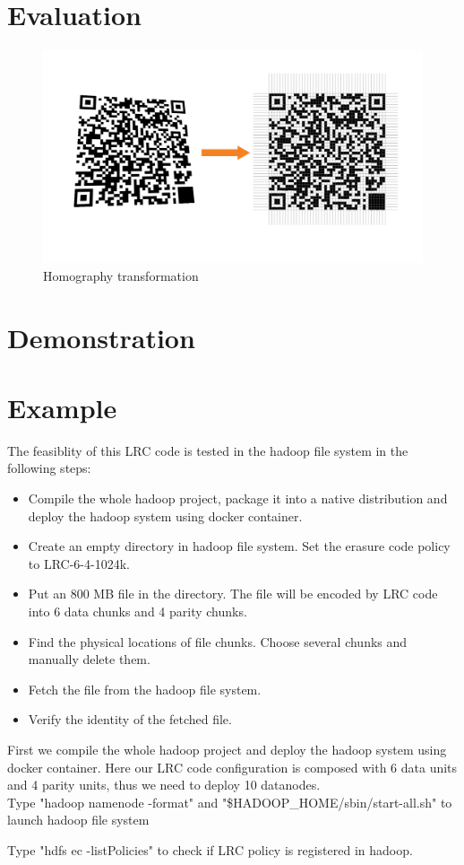 \documentclass[10pt]{article}
\begin{document}
\section{Evaluation}

\begin{figure}[H]
  \centering
  \includegraphics[width=\linewidth]{pic-01.png}
  \caption{Homography transformation}
\end{figure}


\section{Demonstration}

\section{Example}
The feasiblity of this LRC code is tested in the hadoop file system in the following steps:
\begin{itemize}
\item Compile the whole hadoop project, package it into a native distribution and deploy the hadoop system using docker container.
\item Create an empty directory in hadoop file system. Set the erasure code policy to LRC-6-4-1024k.
\item Put an 800 MB file in the directory. The file will be encoded by LRC code into 6 data chunks and 4 parity chunks.
\item Find the physical locations of file chunks. Choose several chunks and manually delete them. 
\item Fetch the file from the hadoop file system. 
\item Verify the identity of the fetched file.
\end{itemize}


First we compile the whole hadoop project and deploy the hadoop system using docker container.
Here our LRC code configuration is composed with 6 data units and 4 parity units, thus we need to deploy 10 datanodes.\\

Type "hadoop namenode -format" and "\$HADOOP\_HOME/sbin/start-all.sh" to launch hadoop file system

Type "hdfs ec -listPolicies" to check if LRC policy is registered in hadoop.
\end{document}
